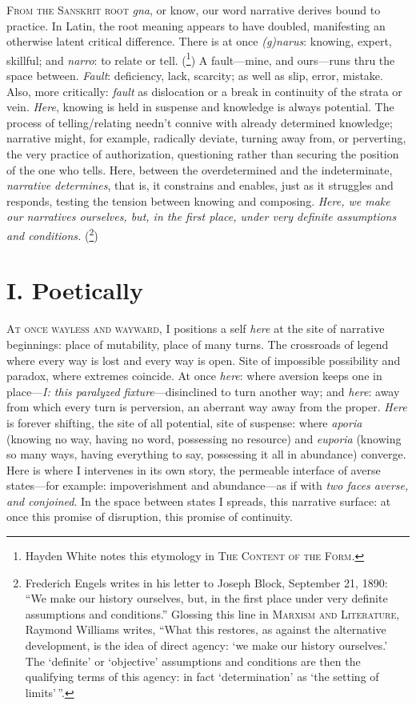 \documentclass[
]{memoir}
\begin{document}
\textsc{From the Sanskrit root} \emph{gna}, or know, our word narrative
derives bound to practice. In Latin, the root meaning appears to have
doubled, manifesting an otherwise latent critical difference. There is
at once \emph{(g)narus}: knowing, expert, skillful; and \emph{narro}: to
relate or tell. (\footnote{Hayden White notes this etymology in
  \textsc{The Content of the Form}\emph{.}}) A fault---mine, and
ours---runs thru the space between. \emph{Fault}: deficiency, lack,
scarcity; as well as slip, error, mistake. Also, more critically:
\emph{fault} as dislocation or a break in continuity of the strata or
vein. \emph{Here}, knowing is held in suspense and knowledge is always
potential. The process of telling/relating needn't connive with already
determined knowledge; narrative might, for example, radically deviate,
turning away from, or perverting, the very practice of authorization,
questioning rather than securing the position of the one who tells.
Here, between the overdetermined and the indeterminate, \emph{narrative
determines}, that is, it constrains and enables, just as it struggles
and responds, testing the tension between knowing and composing.
\emph{Here, we make our narratives ourselves, but, in the first place,
under very definite assumptions and conditions.} (\footnote{Frederich
  Engels writes in his letter to Joseph Block, September 21, 1890: ``We
  make our history ourselves, but, in the first place under very
  definite assumptions and conditions.'' Glossing this line in
  \textsc{Marxism and Literature}, Raymond Williams writes, ``What this
  restores, as against the alternative development, is the idea of
  direct agency: `we make our history ourselves.' The `definite' or
  `objective' assumptions and conditions are then the qualifying terms
  of this agency: in fact `determination' as `the setting of
  limits'\,''.})

\hypertarget{i.-poetically}{%
\section*{I. Poetically}\label{i.-poetically}}

\textsc{At once wayless and wayward}, I positions a self \emph{here} at
the site of narrative beginnings: place of mutability, place of many
turns. The crossroads of legend where every way is lost and every way is
open. Site of impossible possibility and paradox, where extremes
coincide. At once \emph{here}: where aversion keeps one in
place---\emph{I: this paralyzed fixture}---disinclined to turn another
way; and \emph{here}: away from which every turn is perversion, an
aberrant way away from the proper. \emph{Here} is forever shifting, the
site of all potential, site of suspense: where \emph{aporia} (knowing no
way, having no word, possessing no resource) and \emph{euporia} (knowing
so many ways, having everything to say, possessing it all in abundance)
converge. Here is where I intervenes in its own story, the permeable
interface of averse states---for example: impoverishment and
abundance---as if with \emph{two faces averse, and conjoined}. In the
space between states I spreads, this narrative surface: at once this
promise of disruption, this promise of continuity.
\end{document}
